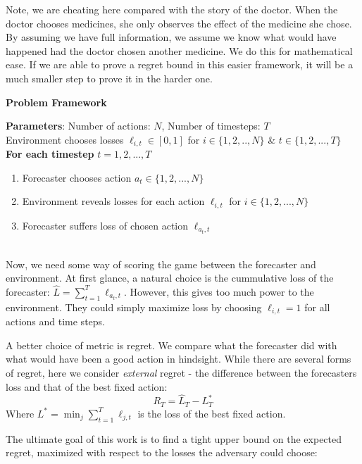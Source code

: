 \documentclass[10pt,a4paper]{article} %
\begin{document}
	Note, we are cheating here compared with the story of the doctor.  When the doctor chooses medicines, she only observes the effect of the medicine she chose.  By assuming we have full information, we assume we know what would have happened had the doctor chosen another medicine.  We do this for mathematical ease.  If we are able to prove a regret bound in this easier framework, it will be a much smaller step to prove it in the harder one.  \\
	
	\noindent \begin{minipage}{\textwidth}
	\centerline{\textbf{Problem Framework}} 
	\noindent\begin{boxedminipage}{\textwidth}
		\textbf{Parameters}: Number of actions: $N$, Number of timesteps: $T$ \\
		Environment chooses losses $\ell_{i, t} \in [0, 1]$ for $i \in \{1, 2, .., N\}$ \& $t \in \{1, 2, ..., T\} $ \\
		\textbf{For each timestep} $t = 1, 2, ..., T$
		\begin{enumerate}
			\item Forecaster chooses action $a_{t} \in \{1, 2, ..., N\}$
			\item Environment reveals losses for each action $\ell_{i, t}$ for $i \in \{1, 2, ..., N\}$
			\item Forecaster suffers loss of chosen action $\ell_{a_t, t}$
		\end{enumerate}
	\end{boxedminipage}
\end{minipage}
	\\ $\,$ \\
	Now, we need some way of scoring the game between the forecaster and environment.  At first glance, a natural choice is the cummulative loss of the forecaster: $\widehat{L} = \sum_{t = 1}^{T} \ell_{a_t, t}$.  However, this gives too much power to the environment.  They could simply maximize loss by choosing $\ell_{i, t} = 1$ for all actions and time steps.
	
	A better choice of metric is regret. We compare what the forecaster did with what would have been a good action in hindsight.  While there are several forms of regret, here we consider \textit{external} regret - the difference between the forecasters loss and that of the best fixed action:
	$$R_T = \widehat{L}_T - L^*_T$$
	Where $L^* = \min_j \sum_{t = 1}^{T} \ell_{j, t}$ is the loss of the best fixed action.  
	
	The ultimate goal of this work is to find a tight upper bound on the expected regret, maximized with respect to the losses the adversary could choose:
	
\end{document}

